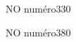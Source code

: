 \documentclass[a4paper,11pt]{report}
\begin{document}
\begin{exof}{NO numéro}{33}{0}
\end{exof}

\begin{exol}{NO numéro}{38}{0}
\end{exol}

\begin{FLP}{67}{0}
\end{FLP}

\begin{QSJ}{78}{0}
\end{QSJ}
\end{document}

